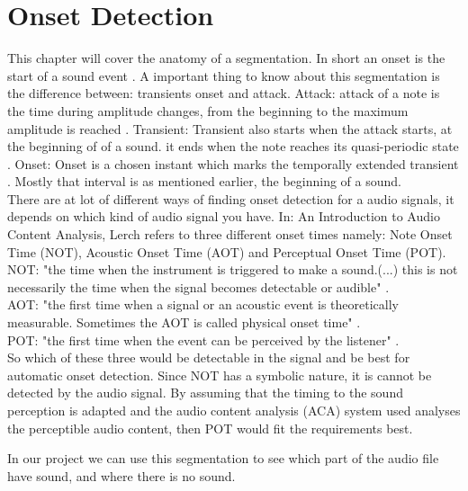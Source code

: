 \section{Onset Detection}
This chapter  will cover the anatomy of a segmentation.
In short an onset is the start of a sound event \citep{ACA}. 
A important thing to know about this segmentation is the difference between: transients onset and attack. 
Attack: attack of a note is the time during amplitude changes, from the beginning to the maximum amplitude is reached \citep{ACA}.
Transient: Transient also starts when the attack starts, at the beginning of of a sound. it ends when the note reaches its quasi-periodic state \citep{ACA}.
Onset: Onset is a chosen instant which marks the temporally extended transient \citep{Bello2005}. Mostly that interval is as mentioned earlier, the beginning of a sound. 
\\
There are at lot of different ways of finding onset detection for a audio signals, it depends on which kind of audio signal you have.
In: An Introduction to Audio Content Analysis, \citep{ACA} Lerch refers to three different onset times namely: Note Onset Time (NOT), Acoustic Onset Time (AOT) and Perceptual Onset Time (POT).
\\
NOT: "the time when the instrument is triggered to make a sound.(...) this is not necessarily the time when the signal becomes detectable or audible" \citep{ACA}.
\\
AOT: "the first time when a signal or an acoustic event is theoretically measurable. Sometimes the AOT is called physical onset time" \citep{ACA}.
\\
POT: "the first time when the event can be perceived by the
listener" \citep{ACA}.
\\
So which of these three would be detectable in the signal and be best for automatic onset detection. Since NOT has a symbolic nature, it is cannot be detected by the audio signal. By assuming that the timing to the sound perception is adapted and the audio content analysis (ACA) system used analyses the perceptible audio content, then POT would fit the requirements best\cite{ACA}.

In our project we can use this segmentation to see which part of the audio file have sound, and where there is no sound. 
